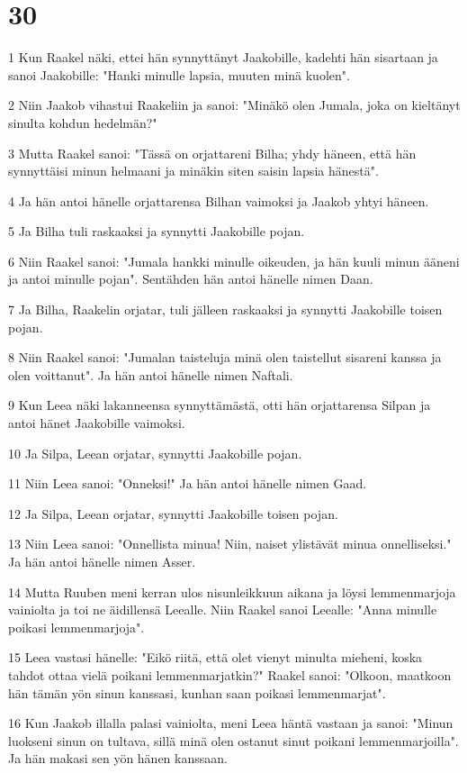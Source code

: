 \chapter{30}

\par 1 Kun Raakel näki, ettei hän synnyttänyt Jaakobille, kadehti hän sisartaan ja sanoi Jaakobille: "Hanki minulle lapsia, muuten minä kuolen".
\par 2 Niin Jaakob vihastui Raakeliin ja sanoi: "Minäkö olen Jumala, joka on kieltänyt sinulta kohdun hedelmän?"
\par 3 Mutta Raakel sanoi: "Tässä on orjattareni Bilha; yhdy häneen, että hän synnyttäisi minun helmaani ja minäkin siten saisin lapsia hänestä".
\par 4 Ja hän antoi hänelle orjattarensa Bilhan vaimoksi ja Jaakob yhtyi häneen.
\par 5 Ja Bilha tuli raskaaksi ja synnytti Jaakobille pojan.
\par 6 Niin Raakel sanoi: "Jumala hankki minulle oikeuden, ja hän kuuli minun ääneni ja antoi minulle pojan". Sentähden hän antoi hänelle nimen Daan.
\par 7 Ja Bilha, Raakelin orjatar, tuli jälleen raskaaksi ja synnytti Jaakobille toisen pojan.
\par 8 Niin Raakel sanoi: "Jumalan taisteluja minä olen taistellut sisareni kanssa ja olen voittanut". Ja hän antoi hänelle nimen Naftali.
\par 9 Kun Leea näki lakanneensa synnyttämästä, otti hän orjattarensa Silpan ja antoi hänet Jaakobille vaimoksi.
\par 10 Ja Silpa, Leean orjatar, synnytti Jaakobille pojan.
\par 11 Niin Leea sanoi: "Onneksi!" Ja hän antoi hänelle nimen Gaad.
\par 12 Ja Silpa, Leean orjatar, synnytti Jaakobille toisen pojan.
\par 13 Niin Leea sanoi: "Onnellista minua! Niin, naiset ylistävät minua onnelliseksi." Ja hän antoi hänelle nimen Asser.
\par 14 Mutta Ruuben meni kerran ulos nisunleikkuun aikana ja löysi lemmenmarjoja vainiolta ja toi ne äidillensä Leealle. Niin Raakel sanoi Leealle: "Anna minulle poikasi lemmenmarjoja".
\par 15 Leea vastasi hänelle: "Eikö riitä, että olet vienyt minulta mieheni, koska tahdot ottaa vielä poikani lemmenmarjatkin?" Raakel sanoi: "Olkoon, maatkoon hän tämän yön sinun kanssasi, kunhan saan poikasi lemmenmarjat".
\par 16 Kun Jaakob illalla palasi vainiolta, meni Leea häntä vastaan ja sanoi: "Minun luokseni sinun on tultava, sillä minä olen ostanut sinut poikani lemmenmarjoilla". Ja hän makasi sen yön hänen kanssaan.
